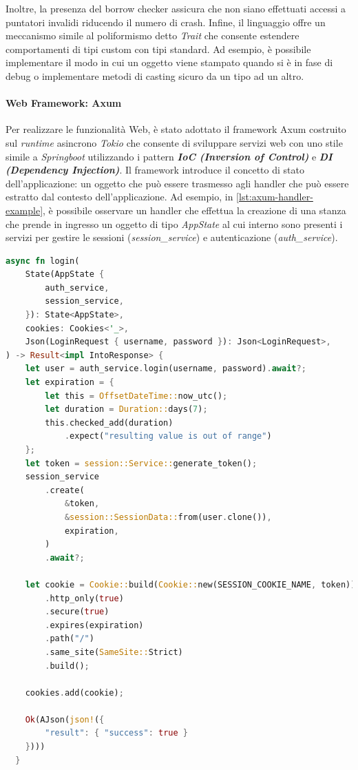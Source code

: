 \documentclass{article}
\begin{document}
Inoltre, la presenza del borrow checker assicura che non siano effettuati 
accessi a puntatori invalidi riducendo il numero di crash. Infine, il linguaggio offre un 
meccanismo simile al poliformismo detto \textit{Trait} che consente estendere comportamenti 
di tipi custom con tipi standard. Ad esempio, è possibile implementare il modo in cui un 
oggetto viene stampato quando si è in fase di debug o implementare metodi di casting sicuro 
da un tipo ad un altro.

\paragraph{Web Framework: Axum} Per realizzare le funzionalità Web, è stato adottato il 
framework Axum costruito sul \textit{runtime} asincrono \textit{Tokio} che consente di 
sviluppare servizi web con uno stile simile a \textit{Springboot} utilizzando i pattern 
\textbf{\textit{IoC (Inversion of Control)}} e \textbf{\textit{DI (Dependency Injection)}}. 
Il framework introduce il concetto di stato dell'applicazione: un oggetto che può essere 
trasmesso agli handler che può essere estratto dal contesto dell'applicazione. Ad esempio,
in \cref{lst:axum-handler-example}, è possibile osservare un handler che effettua la creazione di una stanza che prende 
in ingresso un oggetto di tipo \textit{AppState} al cui interno sono presenti i servizi 
per gestire le sessioni (\textit{session\_service}) e autenticazione (\textit{auth\_service}).

\begin{lstlisting}[language=Rust, style=boxed, label={lst:axum-handler-example}, captionpos=b,caption={Esempio di handler in Axum}]
async fn login(
    State(AppState {
        auth_service,
        session_service,
    }): State<AppState>,
    cookies: Cookies<'_>,
    Json(LoginRequest { username, password }): Json<LoginRequest>,
) -> Result<impl IntoResponse> {
    let user = auth_service.login(username, password).await?;
    let expiration = {
        let this = OffsetDateTime::now_utc();
        let duration = Duration::days(7);
        this.checked_add(duration)
            .expect("resulting value is out of range")
    };
    let token = session::Service::generate_token();
    session_service
        .create(
            &token,
            &session::SessionData::from(user.clone()),
            expiration,
        )
        .await?;

    let cookie = Cookie::build(Cookie::new(SESSION_COOKIE_NAME, token))
        .http_only(true)
        .secure(true)
        .expires(expiration)
        .path("/")
        .same_site(SameSite::Strict)
        .build();
    
    cookies.add(cookie);

    Ok(AJson(json!({
        "result": { "success": true }
    })))
  }



\end{lstlisting}
\end{document}

